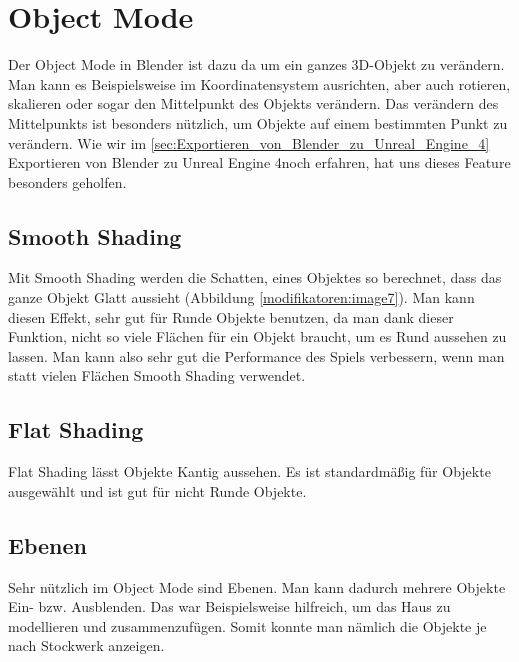\section{Object Mode}
Der Object Mode in Blender ist dazu da um ein ganzes 3D-Objekt zu verändern. Man kann es Beispielsweise im Koordinatensystem ausrichten, aber
auch rotieren, skalieren oder sogar den Mittelpunkt des Objekts verändern. Das verändern des Mittelpunkts ist besonders nützlich, um Objekte auf
einem bestimmten Punkt zu verändern. Wie wir im \autoref{sec:Exportieren_von_Blender_zu_Unreal_Engine_4} \dq  Exportieren von Blender zu Unreal Engine 4\dq noch erfahren, hat uns dieses Feature besonders geholfen.

\subsection{Smooth Shading}
Mit Smooth Shading werden die Schatten, eines Objektes so berechnet, dass das ganze Objekt Glatt aussieht (Abbildung \ref{modifikatoren:image7}).
Man kann diesen Effekt, sehr gut für Runde Objekte benutzen, da man dank dieser Funktion, nicht so viele Flächen für ein Objekt braucht, um
es Rund aussehen zu lassen. Man kann also sehr gut die Performance des Spiels verbessern, wenn man statt vielen Flächen Smooth Shading verwendet.

\subsection{Flat Shading}
Flat Shading lässt Objekte Kantig aussehen. Es ist standardmäßig für Objekte ausgewählt und ist gut für nicht Runde Objekte.

\subsection{Ebenen}
Sehr nützlich im Object Mode sind Ebenen. Man kann dadurch mehrere Objekte Ein- bzw. Ausblenden.
Das war Beispielsweise hilfreich, um das Haus zu modellieren und zusammenzufügen. Somit konnte man nämlich die Objekte je
nach Stockwerk anzeigen. 